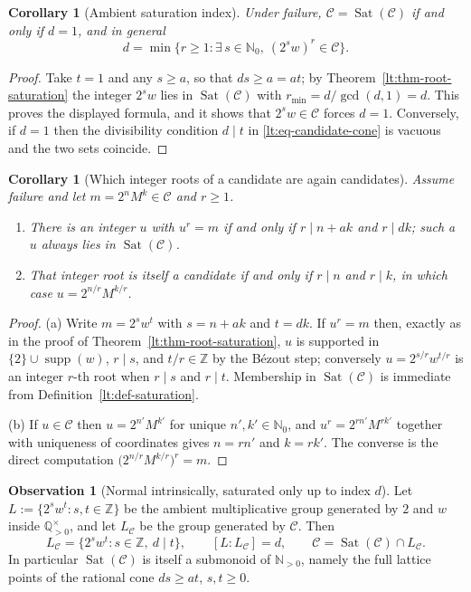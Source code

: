 \documentclass[11pt,oneside]{article}
\newtheorem{corollary}[theorem]{Corollary}
\theoremstyle{definition}
\newtheorem{observation}[theorem]{Observation}
\theoremstyle{remark}
\newcommand{\N}{\mathbb N}
\newcommand{\Nzero}{\mathbb N_0}
\newcommand{\Z}{\mathbb Z}
\newcommand{\Q}{\mathbb Q}
\newcommand{\Cand}{\mathcal C}
\begin{document}
\begin{corollary}[Ambient saturation index]
\label{lt:cor-ambient-index}
Under failure, $\Cand=\operatorname{Sat}(\Cand)$ if and only if $d=1$, and in general
\[
 d=\min\{r\ge1:\exists\,s\in\Nzero,\ (2^sw)^r\in\Cand\}.
\]
\end{corollary}

\begin{proof}
Take $t=1$ and any $s\ge a$, so that $ds\ge a=at$; by Theorem~\ref{lt:thm-root-saturation} the
integer $2^sw$ lies in $\operatorname{Sat}(\Cand)$ with $r_{\min}=d/\gcd(d,1)=d$.  This proves
the displayed formula, and it shows that $2^sw\in\Cand$ forces $d=1$.  Conversely, if $d=1$ then
the divisibility condition $d\mid t$ in \eqref{lt:eq-candidate-cone} is vacuous and the two sets
coincide.
\end{proof}

\begin{corollary}[Which integer roots of a candidate are again candidates]
\label{lt:cor-roots}
Assume failure and let $m=2^nM^k\in\Cand$ and $r\ge1$.
\begin{enumerate}[label=\textup{(\alph*)}]
\item There is an integer $u$ with $u^r=m$ if and only if $r\mid n+ak$ and $r\mid dk$; such a
$u$ always lies in $\operatorname{Sat}(\Cand)$.
\item That integer root is itself a candidate if and only if $r\mid n$ and $r\mid k$, in which
case $u=2^{n/r}M^{k/r}$.
\end{enumerate}
\end{corollary}

\begin{proof}
(a) Write $m=2^sw^t$ with $s=n+ak$ and $t=dk$.  If $u^r=m$ then, exactly as in the proof of
Theorem~\ref{lt:thm-root-saturation}, $u$ is supported in $\{2\}\cup\operatorname{supp}(w)$,
$r\mid s$, and $t/r\in\Z$ by the B\'ezout step; conversely $u=2^{s/r}w^{t/r}$ is an integer
$r$-th root when $r\mid s$ and $r\mid t$.  Membership in $\operatorname{Sat}(\Cand)$ is
immediate from Definition~\ref{lt:def-saturation}.

(b) If $u\in\Cand$ then $u=2^{n'}M^{k'}$ for unique $n',k'\in\Nzero$, and $u^r=2^{rn'}M^{rk'}$
together with uniqueness of coordinates gives $n=rn'$ and $k=rk'$.  The converse is the direct
computation $\bigl(2^{n/r}M^{k/r}\bigr)^r=m$.
\end{proof}

\begin{observation}[Normal intrinsically, saturated only up to index $d$]
\label{lt:obs-index}
Let $L:=\{2^sw^t:s,t\in\Z\}$ be the ambient multiplicative group generated by $2$ and $w$ inside
$\Q_{>0}^{\times}$, and let $L_{\Cand}$ be the group generated by $\Cand$.  Then
\[
 L_{\Cand}=\{2^sw^t:s\in\Z,\ d\mid t\},
 \qquad
 [L:L_{\Cand}]=d,
 \qquad
 \Cand=\operatorname{Sat}(\Cand)\cap L_{\Cand}.
\]
In particular $\operatorname{Sat}(\Cand)$ is itself a submonoid of $\N_{>0}$, namely the full
lattice points of the rational cone $ds\ge at$, $s,t\ge0$.
\end{observation}
\end{document}
